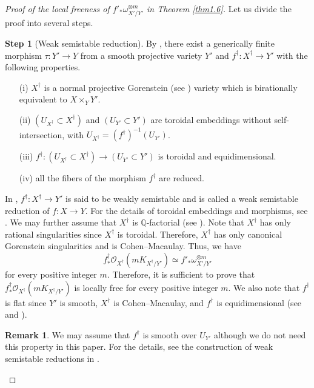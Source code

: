 \documentclass[12pt,twoside]{amsart}
\theoremstyle{definition}
\newtheorem{rem}[thm]{Remark}
\newtheorem{step}{Step}
\begin{document}
\begin{proof}[Proof of the local freeness of $f'_*\omega^{\otimes m}_{X'/Y'}$ 
in Theorem \ref{thm1.6}] Let us divide the proof into several steps. 
\setcounter{step}{0}
\begin{step}[Weak semistable reduction]\label{step1}
By \cite[Definition 0.1 and Theorem 0.3]{abramovich-karu}, 
there exist a generically finite morphism $\tau:Y'\to Y$ from a smooth 
projective variety $Y'$ 
and $f^\dag: X^\dag\to Y'$  
with the following properties. 
\begin{itemize}
\item[(i)] $X^\dag$ is a normal projective 
Gorenstein (see \cite[Lemma 6.1]{abramovich-karu}) 
variety which is birationally equivalent to 
$X\times _Y Y'$. 
\item[(ii)] $(U_{X^\dag}\subset X^\dag)$ and 
$(U_{Y'}\subset Y')$ are toroidal embeddings without self-intersection, with 
$U_{X^\dag} =(f^\dag)^{-1}(U_{Y'})$. 
\item[(iii)] $f^\dag: (U_{X^\dag}\subset X^{\dag})
\to (U_{Y'}\subset Y')$ is toroidal and equidimensional. 
\item[(iv)] all the fibers of the morphism $f^\dag$ are reduced. 
\end{itemize}
In \cite{abramovich-karu}, $f^\dag: X^{\dag}\to Y'$ is said to be weakly semistable and is 
called a 
weak semistable reduction of $f:X\to Y$. 
For the details of toroidal embeddings and 
morphisms, see \cite[Section 1]{abramovich-karu}. 
We may further assume that $X^\dag$ is 
$\mathbb Q$-factorial (see \cite[Remark 4.3]{abramovich-karu}).  
Note that $X^{\dag}$ has only rational singularities 
since $X^{\dag}$ is toroidal. 
Therefore, $X^{\dag}$ has only 
canonical Gorenstein singularities and is Cohen--Macaulay. 
Thus, we have $$
f^\dag_*\mathcal O_{X^{\dag}}(mK_{X^{\dag}/Y'})\simeq f'_*\omega^{\otimes m}_{X'/Y'}
$$ 
for every positive integer $m$. 
Therefore, it is sufficient to prove 
that $f^\dag_*\mathcal O_{X^{\dag}}(mK_{X^{\dag}/Y'})$ is locally 
free for every positive integer $m$. 
We also note that $f^\dag$ is flat since $Y'$ is smooth, $X^\dag$ is 
Cohen--Macaulay, and $f^\dag$ is equidimensional 
(see \cite[Chapter III, Exercise 10.9]{hartshorne} 
and \cite[Chapter V, Proposition (3.5)]{altman-kleiman}). 
\end{step}

\begin{rem}
We may assume that $f^\dag$ is smooth 
over $U_{Y'}$ although we do not need this property in this paper. 
For the details, see the construction of weak semistable reductions 
in \cite{abramovich-karu}. 
\end{rem}


\end{proof}
\end{document}
